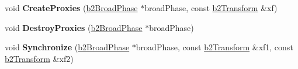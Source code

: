 \begin{DoxyCompactItemize}
\mbox{\label{classb2Fixture_a670f1f687521666da6e92885754970b7}} 
void {\bfseries Create\+Proxies} (\hyperlink{classb2BroadPhase}{b2\+Broad\+Phase} $\ast$broad\+Phase, const \hyperlink{structb2Transform}{b2\+Transform} \&xf)
\item 
\mbox{\label{classb2Fixture_a1def068c9ce09e2ebcccc556951b7979}} 
void {\bfseries Destroy\+Proxies} (\hyperlink{classb2BroadPhase}{b2\+Broad\+Phase} $\ast$broad\+Phase)
\item 
\mbox{\label{classb2Fixture_ac8fd15bfd9a3a7ba05f3831e6f598908}} 
void {\bfseries Synchronize} (\hyperlink{classb2BroadPhase}{b2\+Broad\+Phase} $\ast$broad\+Phase, const \hyperlink{structb2Transform}{b2\+Transform} \&xf1, const \hyperlink{structb2Transform}{b2\+Transform} \&xf2)
\end{DoxyCompactItemize}
